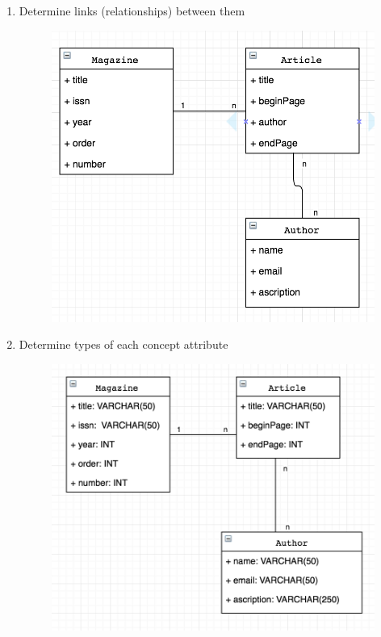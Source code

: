 \documentclass[12pt]{article}
\begin{document}
\begin{enumerate}
\item Determine links (relationships) between them
\begin{figure}[H]
\includegraphics[width=\textwidth]{relations.png}
\end{figure}


\item Determine types of each concept attribute 

\begin{figure}[H]
\includegraphics[width=\textwidth]{types.png}
\end{figure}



\end{enumerate}
\end{document}
